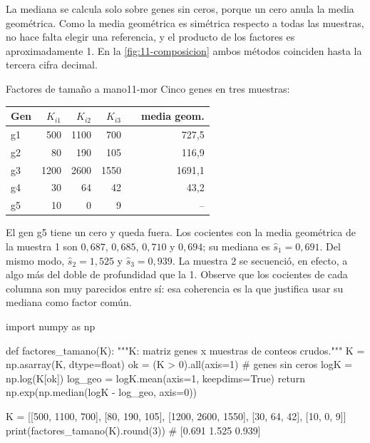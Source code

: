 \begin{simbolos}
\end{simbolos}

La mediana se calcula solo sobre genes sin ceros, porque un cero anula la media geométrica. Como la media geométrica es simétrica respecto a todas las muestras, no hace falta elegir una referencia, y el producto de los factores es aproximadamente 1. En la \cref{fig:11-composicion} ambos métodos coinciden hasta la tercera cifra decimal.

\begin{ejemplo}{Factores de tamaño a mano}{11-mor}
Cinco genes en tres muestras:
\begin{center}\small
\begin{tabular}{@{}lrrrcr@{}}
\toprule
Gen & $K_{i1}$ & $K_{i2}$ & $K_{i3}$ & & media geom.\\
\midrule
g1 & 500 & 1100 & 700 && 727{,}5\\
g2 & 80 & 190 & 105 && 116{,}9\\
g3 & 1200 & 2600 & 1550 && 1691{,}1\\
g4 & 30 & 64 & 42 && 43{,}2\\
g5 & 10 & 0 & 9 && --\\
\bottomrule
\end{tabular}
\end{center}
El gen g5 tiene un cero y queda fuera. Los cocientes con la media geométrica de la muestra 1 son $0{,}687$, $0{,}685$, $0{,}710$ y $0{,}694$; su mediana es $\hat s_1=0{,}691$. Del mismo modo, $\hat s_2=1{,}525$ y $\hat s_3=0{,}939$. La muestra 2 se secuenció, en efecto, a algo más del doble de profundidad que la 1. Observe que los cocientes de cada columna son muy parecidos entre sí: esa coherencia es la que justifica usar su mediana como factor común.
\end{ejemplo}

\begin{codigo}
import numpy as np

def factores_tamano(K):
    """K: matriz genes x muestras de conteos crudos."""
    K = np.asarray(K, dtype=float)
    ok = (K > 0).all(axis=1)              # genes sin ceros
    logK = np.log(K[ok])
    log_geo = logK.mean(axis=1, keepdims=True)
    return np.exp(np.median(logK - log_geo, axis=0))

K = [[500, 1100, 700], [80, 190, 105], [1200, 2600, 1550],
     [30, 64, 42], [10, 0, 9]]
print(factores_tamano(K).round(3))        # [0.691 1.525 0.939]
\end{codigo}

